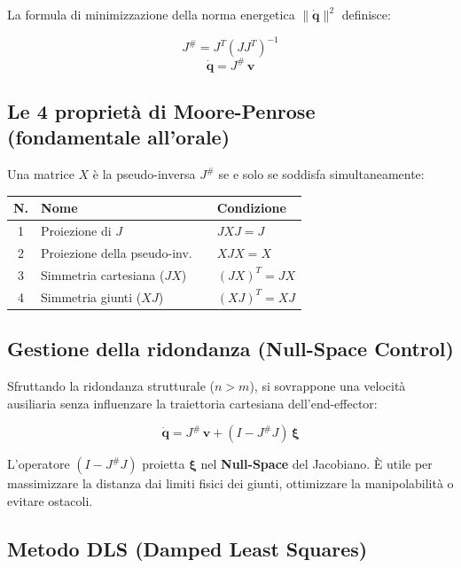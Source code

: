 \documentclass[11pt, a4paper]{article}
\begin{document}
La formula di minimizzazione della norma energetica $\|\dot{\mathbf{q}}\|^2$ definisce:
\begin{formulabox}
\[
J^\# = J^T(JJ^T)^{-1}
\]
\[
\dot{\mathbf{q}} = J^\#\,\mathbf{v}
\]
\end{formulabox}

\subsection{Le 4 proprietà di Moore-Penrose (fondamentale all'orale)}

Una matrice $X$ è la pseudo-inversa $J^\#$ se e solo se soddisfa simultaneamente:

\begin{center}
\renewcommand{\arraystretch}{1.8}
\begin{tabular}{clcl}
\toprule
\textbf{N.} & \textbf{Nome} & & \textbf{Condizione}\\
\midrule
1 & Proiezione di $J$            & & $JXJ = J$\\
2 & Proiezione della pseudo-inv. & & $XJX = X$\\
3 & Simmetria cartesiana ($JX$)  & & $(JX)^T = JX$\\
4 & Simmetria giunti ($XJ$)      & & $(XJ)^T = XJ$\\
\bottomrule
\end{tabular}
\end{center}

\subsection{Gestione della ridondanza (Null-Space Control)}

Sfruttando la ridondanza strutturale ($n > m$), si sovrappone una velocità ausiliaria
senza influenzare la traiettoria cartesiana dell'end-effector:
\begin{formulabox}
\[
\dot{\mathbf{q}} = J^\#\,\mathbf{v} + (I - J^\#J)\,\boldsymbol{\xi}
\]
\end{formulabox}

L'operatore $(I - J^\#J)$ proietta $\boldsymbol{\xi}$ nel \textbf{Null-Space} del Jacobiano.
È utile per massimizzare la distanza dai limiti fisici dei giunti, ottimizzare la
manipolabilità o evitare ostacoli.

\subsection{Metodo DLS (Damped Least Squares)}
\end{document}
